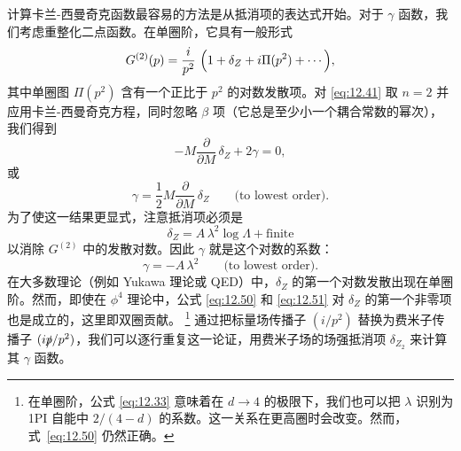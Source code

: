 计算卡兰-西曼奇克函数最容易的方法是从抵消项的表达式开始。对于 $\gamma$ 函数，我们考虑重整化二点函数。在单圈阶，它具有一般形式
\begin{equation}
  G^{(2)}(p) = \frac{i}{p^2}\ \Bigl( 1 + \delta_Z + i\Pi(p^2) + \cdots
    \Bigr),
  \label{eq:12.49}
\end{equation}
其中单圈图 $\Pi(p^2)$ 含有一个正比于 $p^2$ 的对数发散项。对 \eqref{eq:12.41} 取 $n = 2$ 并应用卡兰-西曼奇克方程，同时忽略 $\beta$ 项（它总是至少小一个耦合常数的幂次），我们得到
\begin{equation}
  -M\frac{\partial}{\partial M}\,\delta_Z + 2\gamma = 0,
\end{equation}
或
\begin{equation}
  \gamma = \frac{1}{2}M\frac{\partial}{\partial M}\,\delta_Z
    \qquad \text{(to lowest order)} .
  \label{eq:12.50}
\end{equation}
为了使这一结果更显式，注意抵消项必须是
\begin{equation}
  \delta_Z = A\,\lambda^2\log\Lambda + \text{finite}
\end{equation}
以消除 $G^{(2)}$ 中的发散对数。因此 $\gamma$ 就是这个对数的系数：
\begin{equation}
  \gamma = -A\,\lambda^2 \qquad \text{(to lowest order)} .
  \label{eq:12.51}
\end{equation}
在大多数理论（例如 Yukawa 理论或 QED）中，$\delta_Z$ 的第一个对数发散出现在单圈阶。然而，即使在 $\phi^4$ 理论中，公式 \eqref{eq:12.50} 和 \eqref{eq:12.51} 对 $\delta_Z$ 的第一个非零项也是成立的，这里即双圈贡献。%
\footnote{在单圈阶，公式 \eqref{eq:12.33} 意味着在 $d\to 4$ 的极限下，我们也可以把 $\lambda$ 识别为 1PI 自能中 $2/(4-d)$ 的系数。这一关系在更高圈时会改变。然而，式~\eqref{eq:12.50} 仍然正确。} 通过把标量场传播子 $(i/p^2)$ 替换为费米子传播子 $(i\slashed{p}/p^2)$，我们可以逐行重复这一论证，用费米子场的场强抵消项 $\delta_{Z_2}$ 来计算其 $\gamma$ 函数。


